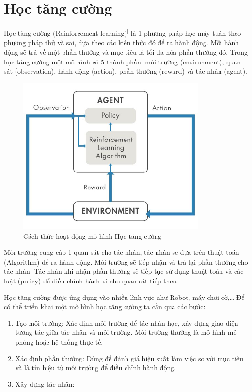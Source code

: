 \documentclass[14pt,oneside]{scrbook}
\providecommand{\tightlist}{\setlength{\itemsep}{\smallskipamount}\setlength{\parskip}{\smallskipamount}}
\begin{document}
\section{Học tăng cường}\label{hux1ecdc-tux103ng-cux1b0ux1eddng}

Học tăng cường (Reinforcement
learning)\textsuperscript{{[}\citeproc{ref-rl}{8}{]}} là 1 phương pháp
học máy tuân theo phương pháp thử và sai, dựa theo các kiến thức đó để
ra hành động. Mỗi hành động sẽ trả về một phần thưởng và mục tiêu là tối
đa hóa phần thưởng đó. Trong học tăng cường một mô hình có 5 thành phần:
môi trường (environment), quan sát (observation), hành động (action),
phần thưởng (reward) và tác nhân (agent).

\begin{figure}
\centering
\includegraphics[width=\textwidth,height=8cm]{image/ml_model.jpg}
\caption{Cách thức hoạt động mô hình Học tăng cường}
\end{figure}

Môi trường cung cấp 1 quan sát cho tác nhân, tác nhân sẽ dựa trên thuật
toán (Algorithm) để ra hành động. Môi trường sẽ tiếp nhận và trả lại
phần thưởng cho tác nhân. Tác nhân khi nhận phần thưởng sẽ tiếp tục sử
dụng thuật toán và các luật (policy) để điều chỉnh hành vi cho quan sát
tiếp theo.

Học tăng cường được ứng dụng vào nhiều lĩnh vực như Robot, máy chơi
cờ,\ldots{} Để có thể triển khai một mô hình học tăng cường ta cần qua
các bước:

\begin{enumerate}
\def\labelenumi{\arabic{enumi})}
\tightlist
\item
  Tạo môi trường: Xác định môi trường để tác nhân học, xây dựng giao
  diện tương tác giữa tác nhân và môi trường. Môi trường thường là mô
  hình mô phỏng hoặc hệ thống thực tế.
\item
  Xác định phần thưởng: Dùng để đánh giá hiệu suất làm việc so với mục
  tiêu và là tín hiệu từ môi trường để điều chỉnh hành động.
\item
  Xây dựng tác nhân:
\end{enumerate}
\end{document}

